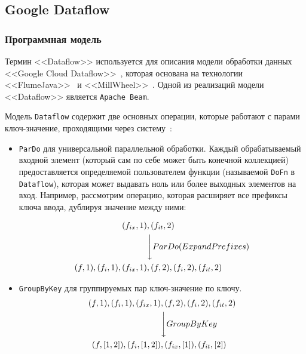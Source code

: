 \subsection{Google Dataflow}

\subsubsection{Программная модель}

Термин <<Dataflow>> используется для описания модели обработки данных <<Google Cloud Dataflow>>~\cite{dataflow}, которая основана на технологии <<FlumeJava>>~\cite{flumejava} и <<MillWheel>>~\cite{millwheel}.
Одной из реализаций модели <<Dataflow>> является \texttt{Apache Beam}.

Модель \texttt{Dataflow} содержит две основных операции, которые работают с парами ключ-значение, проходящими через систему~\cite{dataflow-paper}:

\begin{itemize}
  \item \texttt{ParDo} для универсальной параллельной обработки. 
    Каждый обрабатываемый входной элемент (который сам по себе может быть конечной коллекцией) предоставляется определяемой пользователем функции (называемой \texttt{DoFn} в \texttt{Dataflow}), которая может выдавать ноль или более выходных элементов на вход. 
    Например, рассмотрим операцию, которая расширяет все префиксы ключа ввода, дублируя значение между ними:

    \[
    \begin{split}
      (f_{ix}, 1)&, (f_{it}, 2) \\
      &\Bigg\downarrow ParDo(ExpandPrefixes) \\
      (f, 1), (f_{i}, 1), (f_{ix}, 1)&, (f, 2), (f_{i}, 2), (f_{it}, 2) 
    \end{split}
  \]
  
\item \texttt{GroupByKey} для группируемых пар ключ-значение по ключу.
    \[
    \begin{split}
      (f, 1), (f_{i}, 1), (f_{ix}, 1)&, (f, 2), (f_{i}, 2), (f_{it}, 2) \\
      &\Bigg\downarrow GroupByKey \\
      (f, [1, 2]), (f_{i}, [1, 2])&, (f_{ix}, [1]), (f_{it}, [2]) 
    \end{split}
  \]
\end{itemize}

